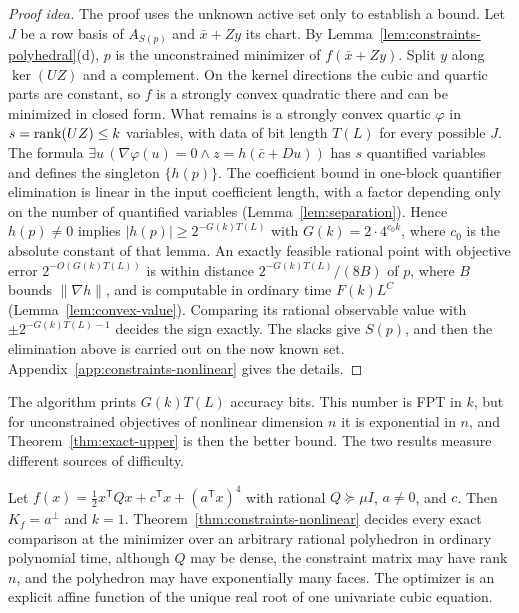 \begin{proof}[Proof idea]
The proof uses the unknown active set only to establish a bound. Let $J$ be
a row basis of $A_{S(p)}$ and $\bar x+Zy$ its chart. By
Lemma~\ref{lem:constraints-polyhedral}(d), $p$ is the unconstrained minimizer
of $f(\bar x+Zy)$. Split $y$ along $\ker(UZ)$ and a complement. On the kernel
directions the cubic and quartic parts are constant, so $f$ is a strongly
convex quadratic there and can be minimized in closed form. What remains is
a strongly convex quartic $\varphi$ in $s=\operatorname{rank}(UZ)\le k$ variables, with
data of bit length $T(L)$ for every possible $J$. The formula
$\exists u\,(\nabla\varphi(u)=0\wedge z=h(\bar c+Du))$ has $s$ quantified
variables and defines the singleton $\{h(p)\}$. The coefficient bound in
one-block quantifier elimination is linear in the input coefficient length,
with a factor depending only on the number of quantified variables
(Lemma~\ref{lem:separation}). Hence $h(p)\ne0$ implies
$|h(p)|\ge2^{-G(k)T(L)}$ with $G(k)=2\cdot4^{c_0k}$, where $c_0$ is the
absolute constant of that lemma. An exactly feasible rational
point with objective error $2^{-O(G(k)T(L))}$ is within distance
$2^{-G(k)T(L)}/(8B)$ of $p$, where $B$ bounds $\|\nabla h\|$, and is
computable in ordinary time $F(k)L^{C}$ (Lemma~\ref{lem:convex-value}).
Comparing its rational observable value with $\pm2^{-G(k)T(L)-1}$ decides
the sign exactly. The slacks give $S(p)$, and then the elimination above is
carried out on the now known set. Appendix~\ref{app:constraints-nonlinear}
gives the details.
\end{proof}

The algorithm prints $G(k)T(L)$ accuracy bits. This number is FPT in $k$,
but for unconstrained objectives of nonlinear dimension $n$ it is
exponential in $n$, and Theorem~\ref{thm:exact-upper} is then the better
bound. The
two results measure different sources of difficulty.

\begin{example}\label{ex:constraints-rank-one-quartic}
Let $f(x)=\tfrac12x^{\mathsf T}Qx+c^{\mathsf T}x+(a^{\mathsf T}x)^4$ with
rational $Q\succeq\mu I$, $a\ne0$, and $c$. Then $K_f=a^\perp$ and $k=1$.
Theorem~\ref{thm:constraints-nonlinear} decides every exact comparison at the
minimizer over an arbitrary rational polyhedron in ordinary polynomial time,
although $Q$ may be dense, the constraint matrix may have rank $n$, and the
polyhedron may have exponentially many faces. The optimizer is an explicit
affine function of the unique real root of one univariate cubic equation.
\end{example}

